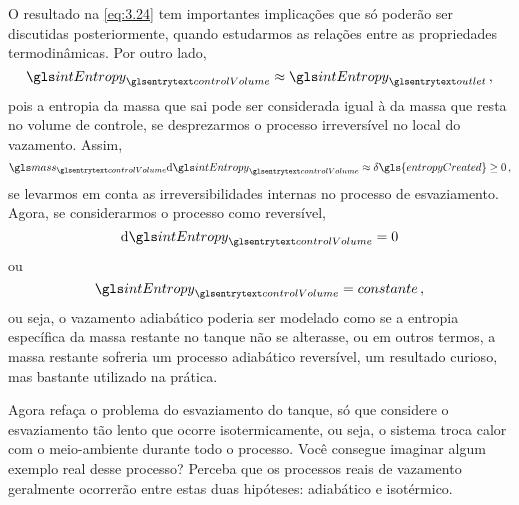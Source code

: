     O resultado na \cref{eq:3.24} tem importantes implicações que só poderão
    ser discutidas posteriormente, quando estudarmos as relações entre as
    propriedades termodinâmicas. Por outro lado,
    \begin{equation} \label{eq:3.25}
        \gsub{intEntropy}{controlVolume}
        \approx
        \gsub{intEntropy}{outlet}\,,
    \end{equation}
    pois a entropia da massa que sai pode ser considerada igual à da massa que
    resta no volume de controle, se desprezarmos o processo irreversível no
    local do vazamento. Assim,
    \begin{equation} \label{eq:3.26}
        \gsub{mass}{controlVolume}
        \diff{\gsub{intEntropy}{controlVolume}}
        \approx
        \idiff{\gls{entropyCreated}}
        \ge 0\,,
    \end{equation}
    se levarmos em conta as irreversibilidades internas no processo de
    esvaziamento. Agora, se considerarmos o processo como reversível,
    \begin{equation}
        \diff{\gsub{intEntropy}{controlVolume}}
        =
        0
    \end{equation}
    ou
    \begin{equation} \label{eq:3.27}
        \gsub{intEntropy}{controlVolume}
        =
        constante\,,
    \end{equation}
    ou seja, o vazamento adiabático poderia ser modelado como se a entropia
    específica da massa restante no tanque não se alterasse, ou em outros
    termos, a massa restante sofreria um processo adiabático reversível, um
    resultado curioso, mas bastante utilizado na prática.

    Agora refaça o problema do esvaziamento do tanque, só que considere o
    esvaziamento tão lento que ocorre isotermicamente, ou seja, o sistema troca
    calor com o meio-ambiente durante todo o processo. Você consegue imaginar
    algum exemplo real desse processo? Perceba que os processos reais de
    vazamento geralmente ocorrerão entre estas duas hipóteses: adiabático e
    isotérmico.
